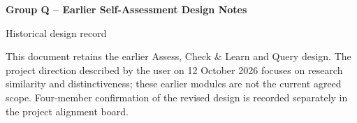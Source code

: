 \documentclass[11pt,a4paper]{article}
\begin{document}
\begin{center}
{\Large\bfseries Group Q -- Earlier Self-Assessment Design Notes\par}
\medskip
{\large Historical design record\par}
\end{center}
\noindent This document retains the earlier Assess, Check \& Learn and Query design. The project direction described by the user on 12 October 2026 focuses on research similarity and distinctiveness; these earlier modules are not the current agreed scope. Four-member confirmation of the revised design is recorded separately in the project alignment board.

\clearpage


\end{document}
